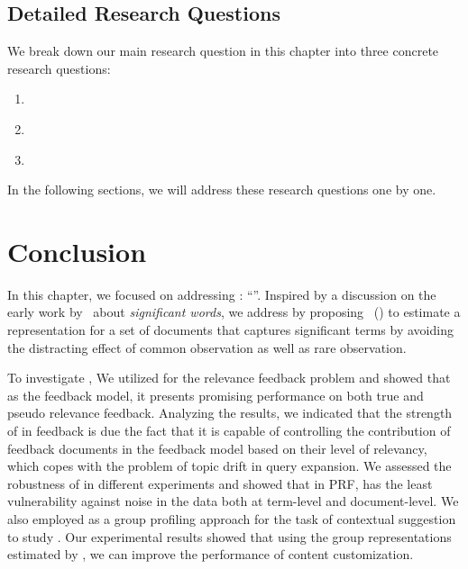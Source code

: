 \subsection{Detailed Research Questions}
We break down our main research question in this chapter into three concrete research questions:
\begin{resqbox}
\begin{enumerate}
\item[\textbf{\resqname{c2.1}}] \emph{}
\item[\textbf{\resqname{c2.2}}] \emph{}
\item[\textbf{\resqname{c2.3}}] \emph{}
\end{enumerate}
\end{resqbox}
In the following sections, we will address these research questions one by one.





\section{Conclusion} 
In this chapter, we focused on addressing \textbf{}: ``\emph{}''.
Inspired by a discussion on the early work by~\citet{Luhn:1958} about \emph{significant words}, we address \textbf{} by proposing \emph{\swlms}\ (\acswlm) to estimate a representation for a set of documents that captures significant terms by avoiding the distracting effect of common observation as well as rare observation.

To investigate \textbf{}, We utilized \acswlm for the relevance feedback problem and showed that as the feedback model, it presents promising performance on both true and pseudo relevance feedback. Analyzing the results, we indicated that the strength of \acswlm in feedback is due the fact that it is capable of controlling the contribution of feedback documents in the feedback model based on their level of relevancy, which copes with the problem of topic drift in query expansion. We assessed the robustness of \acswlm in different experiments and showed that in PRF, \acswlm has the least vulnerability against noise in the data both at term-level and document-level.
%
We also employed \acswlm as a group profiling approach for the task of contextual suggestion to study \textbf{}. Our experimental results showed that using the group representations estimated by \acswlm, we can improve the performance of content customization. 

